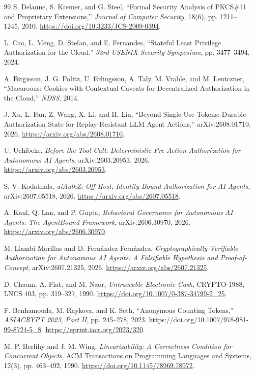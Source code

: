 \documentclass[10pt]{article}
\begin{document}
\begin{thebibliography}{99}
S. Delaune, S. Kremer, and G. Steel,
``Formal Security Analysis of PKCS\#11 and Proprietary Extensions,''
\emph{Journal of Computer Security}, 18(6), pp. 1211--1245, 2010.
\url{https://doi.org/10.3233/JCS-2009-0394}.

L. Cao, L. Meng, D. Stefan, and E. Fernandes,
``Stateful Least Privilege Authorization for the Cloud,''
\emph{33rd USENIX Security Symposium}, pp. 3477--3494, 2024.

A. Birgisson, J. G. Politz, U. Erlingsson, A. Taly, M. Vrable, and M. Lentczner,
``Macaroons: Cookies with Contextual Caveats for Decentralized Authorization in
the Cloud,'' \emph{NDSS}, 2014.

J. Xu, L. Fan, Z. Wang, X. Li, and H. Liu,
``Beyond Single-Use Tokens: Durable Authorization State for Replay-Resistant
LLM Agent Actions,'' arXiv:2608.01710, 2026.
\url{https://arxiv.org/abs/2608.01710}.

U. Uchibeke,
\emph{Before the Tool Call: Deterministic Pre-Action Authorization for
Autonomous AI Agents}, arXiv:2603.20953, 2026.
\url{https://arxiv.org/abs/2603.20953}.

S. V. Kodathala,
\emph{aiAuthZ: Off-Host, Identity-Bound Authorization for AI Agents},
arXiv:2607.05518, 2026.
\url{https://arxiv.org/abs/2607.05518}.

A. Kaul, Q. Lan, and P. Gupta,
\emph{Behavioral Governance for Autonomous AI Agents: The AgentBound Framework},
arXiv:2606.30970, 2026.
\url{https://arxiv.org/abs/2606.30970}.

M. Llamb\'i-Morillas and D. Fern\'andez-Fern\'andez,
\emph{Cryptographically Verifiable Authorization for Autonomous AI Agents: A
Falsifiable Hypothesis and Proof-of-Concept}, arXiv:2607.21325, 2026.
\url{https://arxiv.org/abs/2607.21325}.

D. Chaum, A. Fiat, and M. Naor,
\emph{Untraceable Electronic Cash}, CRYPTO 1988, LNCS 403,
pp. 319--327, 1990.
\url{https://doi.org/10.1007/0-387-34799-2_25}.

F. Benhamouda, M. Raykova, and K. Seth,
``Anonymous Counting Tokens,''
\emph{ASIACRYPT 2023, Part II}, pp. 245--278, 2023.
\url{https://doi.org/10.1007/978-981-99-8724-5_8}.
\url{https://eprint.iacr.org/2023/320}.

M. P. Herlihy and J. M. Wing,
\emph{Linearizability: A Correctness Condition for Concurrent Objects},
ACM Transactions on Programming Languages and Systems, 12(3),
pp. 463--492, 1990.
\url{https://doi.org/10.1145/78969.78972}.


\end{thebibliography}
\end{document}
